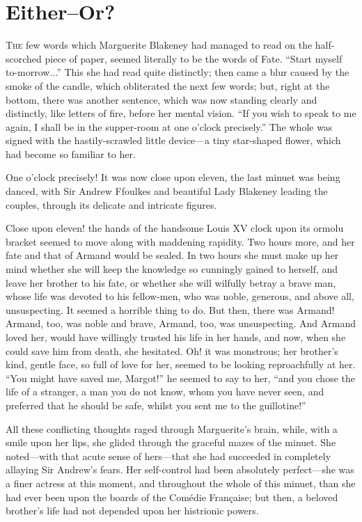 
\chapter[Either---Or?]{Either–Or?}
\lettrine[lines=4]{T}{he} few words which Marguerite Blakeney had managed to read on the half-scorched piece of paper, seemed literally to be the words of Fate. \enquote{Start myself to-morrow...} This she had read quite distinctly; then came a blur caused by the smoke of the candle, which obliterated the next few words; but, right at the bottom, there was another sentence, which was now standing clearly and distinctly, like letters of fire, before her mental vision. \enquote{If you wish to speak to me again, I shall be in the supper-room at one o'clock precisely.} The whole was signed with the hastily-scrawled little device---a tiny star-shaped flower, which had become so familiar to her.

One o'clock precisely! It was now close upon eleven, the last minuet was being danced, with Sir Andrew Ffoulkes and beautiful Lady Blakeney leading the couples, through its delicate and intricate figures.

Close upon eleven! the hands of the handsome Louis XV clock upon its ormolu bracket seemed to move along with maddening rapidity. Two hours more, and her fate and that of Armand would be sealed. In two hours she must make up her mind whether she will keep the knowledge so cunningly gained to herself, and leave her brother to his fate, or whether she will wilfully betray a brave man, whose life was devoted to his fellow-men, who was noble, generous, and above all, unsuspecting. It seemed a horrible thing to do. But then, there was Armand! Armand, too, was noble and brave, Armand, too, was unsuspecting. And Armand loved her, would have willingly trusted his life in her hands, and now, when she could save him from death, she hesitated. Oh! it was monstrous; her brother's kind, gentle face, so full of love for her, seemed to be looking reproachfully at her. \enquote{You might have saved me, Margot!} he seemed to say to her, \enquote{and you chose the life of a stranger, a man you do not know, whom you have never seen, and preferred that he should be safe, whilst you sent me to the guillotine!}

All these conflicting thoughts raged through Marguerite's brain, while, with a smile upon her lips, she glided through the graceful mazes of the minuet. She noted---with that acute sense of hers---that she had succeeded in completely allaying Sir Andrew's fears. Her self-control had been absolutely perfect---she was a finer actress at this moment, and throughout the whole of this minuet, than she had ever been upon the boards of the Comédie Française; but then, a beloved brother's life had not depended upon her histrionic powers.

